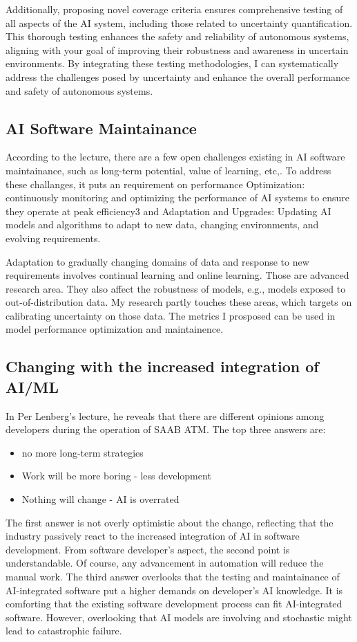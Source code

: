 \documentclass{article}
\begin{document}
Additionally, proposing novel coverage criteria ensures comprehensive testing of all aspects of the AI system, including those related to uncertainty quantification. This thorough testing enhances the safety and reliability of autonomous systems, aligning with your goal of improving their robustness and awareness in uncertain environments. By integrating these testing methodologies, I can systematically address the challenges posed by uncertainty and enhance the overall performance and safety of autonomous systems.
\subsection{AI Software Maintainance}
According to the lecture, there are a few open challenges existing in AI software maintainance, such as long-term potential, value of learning, etc,.
To address these challanges, it puts an requirement on performance Optimization: continuously monitoring and optimizing the performance of AI systems to ensure they operate at peak efficiency3 and 
Adaptation and Upgrades: Updating AI models and algorithms to adapt to new data, changing environments, and evolving requirements.

Adaptation to gradually changing domains of data and response to new requirements involves continual learning and online learning. Those are advanced research area.
They also affect the robustness of models, e.g., models exposed to out-of-distribution data.
My research partly touches these areas, which targets on calibrating uncertainty on those data.
The metrics I prosposed can be used in model performance optimization and maintainence.

\subsection{Changing with the increased integration of AI/ML}
In Per Lenberg's lecture, he reveals that there are different opinions among developers during the operation of SAAB ATM. The top three answers are:
\begin{itemize}
    \item no more long-term strategies
    \item Work will be more boring - less development
    \item Nothing will change - AI is overrated
\end{itemize}
The first answer is not overly optimistic about the change, reflecting that the industry passively react to the increased integration of AI in software development. 
From software developer's aspect, the second point is understandable. Of course, any advancement in automation will reduce the manual work. 
The third answer overlooks that the testing and maintainance of AI-integrated software put a higher demands on developer's AI knowledge.
It is comforting that the existing software development process can fit AI-integrated software.
However, overlooking that AI models are involving and stochastic might lead to catastrophic failure.
\end{document}
